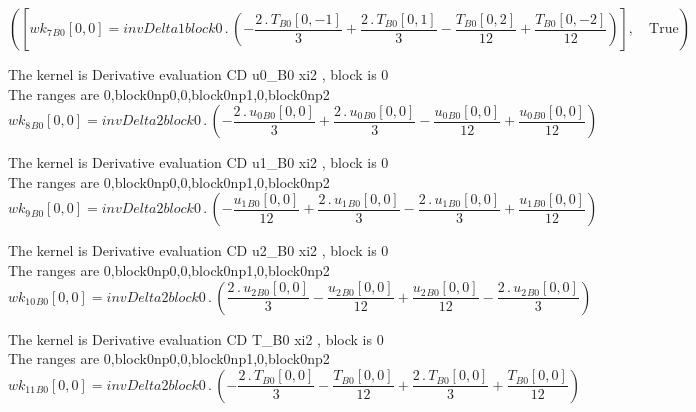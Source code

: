 \documentclass{article}
\begin{document}
\begin{dmath}\left ( \left [ {wk_{7}{_{B0}}}[{0,0}] = invDelta1block0 \,.\, \left(- \frac{2 \,.\, {T{_{B0}}}[{0,-1}]}{3} + \frac{2 \,.\, {T{_{B0}}}[{0,1}]}{3} - \frac{{T{_{B0}}}[{0,2}]}{12} + \frac{{T{_{B0}}}[{0,-2}]}{12}\right)\right ], \quad 
\mathrm{True}\right )\end{dmath}

\noindent The kernel is Derivative evaluation CD u0_B0 xi2 , block is 0\\\noindent The ranges are 0,block0np0,0,block0np1,0,block0np2\\\begin{dmath}{wk_{8}{_{B0}}}[{0,0}] = invDelta2block0 \,.\, \left(- \frac{2 \,.\, {u_{0}{_{B0}}}[{0,0}]}{3} + \frac{2 \,.\, {u_{0}{_{B0}}}[{0,0}]}{3} - \frac{{u_{0}{_{B0}}}[{0,0}]}{12} + \frac{{u_{0}{_{B0}}}[{0,0}]}{12}\right)\end{dmath}

\noindent The kernel is Derivative evaluation CD u1_B0 xi2 , block is 0\\\noindent The ranges are 0,block0np0,0,block0np1,0,block0np2\\\begin{dmath}{wk_{9}{_{B0}}}[{0,0}] = invDelta2block0 \,.\, \left(- \frac{{u_{1}{_{B0}}}[{0,0}]}{12} + \frac{2 \,.\, {u_{1}{_{B0}}}[{0,0}]}{3} - \frac{2 \,.\, {u_{1}{_{B0}}}[{0,0}]}{3} + \frac{{u_{1}{_{B0}}}[{0,0}]}{12}\right)\end{dmath}

\noindent The kernel is Derivative evaluation CD u2_B0 xi2 , block is 0\\\noindent The ranges are 0,block0np0,0,block0np1,0,block0np2\\\begin{dmath}{wk_{10}{_{B0}}}[{0,0}] = invDelta2block0 \,.\, \left(\frac{2 \,.\, {u_{2}{_{B0}}}[{0,0}]}{3} - \frac{{u_{2}{_{B0}}}[{0,0}]}{12} + \frac{{u_{2}{_{B0}}}[{0,0}]}{12} - \frac{2 \,.\, {u_{2}{_{B0}}}[{0,0}]}{3}\right)\end{dmath}

\noindent The kernel is Derivative evaluation CD T_B0 xi2 , block is 0\\\noindent The ranges are 0,block0np0,0,block0np1,0,block0np2\\\begin{dmath}{wk_{11}{_{B0}}}[{0,0}] = invDelta2block0 \,.\, \left(- \frac{2 \,.\, {T{_{B0}}}[{0,0}]}{3} - \frac{{T{_{B0}}}[{0,0}]}{12} + \frac{2 \,.\, {T{_{B0}}}[{0,0}]}{3} + \frac{{T{_{B0}}}[{0,0}]}{12}\right)\end{dmath}
\end{document}

